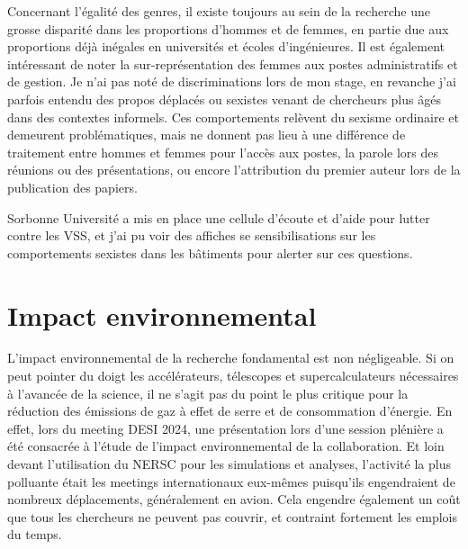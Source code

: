 \documentclass{book}
\begin{document}
Concernant l'égalité des genres, il existe toujours au sein de la recherche une grosse disparité dans les proportions d'hommes et de femmes, en partie due aux proportions déjà inégales en universités et écoles d'ingénieures. Il est également intéressant de noter la sur-représentation des femmes aux postes administratifs et de gestion. Je n'ai pas noté de discriminations lors de mon stage, en revanche j'ai parfois entendu des propos déplacés ou sexistes venant de chercheurs plus âgés dans des contextes informels. Ces comportements relèvent du sexisme ordinaire et demeurent problématiques, mais ne donnent pas lieu à une différence de traitement entre hommes et femmes pour l'accès aux postes, la parole lors des réunions ou des présentations, ou encore l'attribution du premier auteur lors de la publication des papiers.

Sorbonne Université a mis en place une cellule d'écoute et d'aide pour lutter contre les VSS, et j'ai pu voir des affiches se sensibilisations sur les comportements sexistes dans les bâtiments pour alerter sur ces questions.

\section{Impact environnemental}

L'impact environnemental de la recherche fondamental est non négligeable. Si on peut pointer du doigt les accélérateurs, télescopes et supercalculateurs nécessaires à l'avancée de la science, il ne s'agit pas du point le plus critique pour la réduction des émissions de gaz à effet de serre et de consommation d'énergie. En effet, lors du meeting DESI 2024, une présentation lors d'une session plénière a été consacrée à l'étude de l'impact environnemental de la collaboration. Et loin devant l'utilisation du NERSC pour les simulations et analyses, l'activité la plus polluante était les meetings internationaux eux-mêmes puisqu'ils engendraient de nombreux déplacements, généralement en avion. Cela engendre également un coût que tous les chercheurs ne peuvent pas couvrir, et contraint fortement les emplois du temps.
\end{document}
